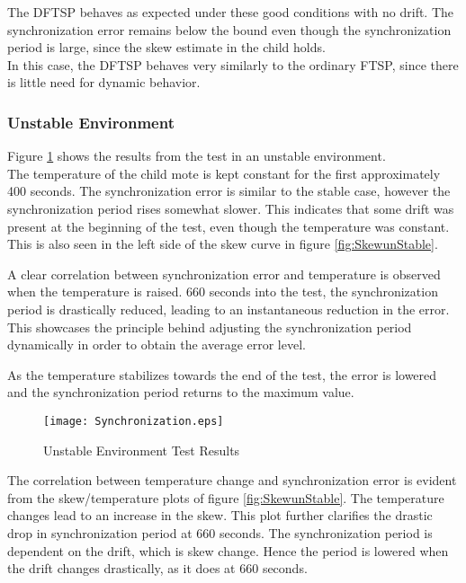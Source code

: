 \documentclass[Main]{subfiles}
\begin{document}
			The DFTSP behaves as expected under these good conditions with no drift. 
			The synchronization error remains below the bound even though the synchronization period is large, since the skew estimate in the child holds.
			\\ In this case, the DFTSP behaves very similarly to the ordinary FTSP, since there is little need for dynamic behavior. 



		\subsubsection{Unstable Environment} %
		\label{sub:unstable_environment}
			
			 Figure \ref{fig:unstableSynchronization} shows the results from the test in an unstable environment.
			 \\The temperature of the child mote is kept constant for the first approximately 400 seconds.
			 The synchronization error is similar to the stable case, however the synchronization period rises somewhat slower.
			 This indicates that some drift was present at the beginning of the test, even though the temperature was constant.
			 This is also seen in the left side of the skew curve in figure \ref{fig:SkewunStable}. 

			 A clear correlation between synchronization error and temperature is observed when the temperature is raised.
			 660 seconds into the test, the synchronization period is drastically reduced, leading to an instantaneous reduction in the error.
			 This showcases the principle behind adjusting the synchronization period dynamically in order to obtain the average error level.

			 As the temperature stabilizes towards the end of the test, the error is lowered and the synchronization period returns to the maximum value.  

			\begin{figure}[H]
				\centering
				\texttt{[image: Synchronization.eps]}
				\caption{Unstable Environment Test Results}
				\label{fig:unstableSynchronization}
			\end{figure}

			The correlation between temperature change and synchronization error is evident from the skew/temperature plots of figure \ref{fig:SkewunStable}.
			The temperature changes lead to an increase in the skew.
			This plot further clarifies the drastic drop in synchronization period at 660 seconds.
			The synchronization period is dependent on the drift, which is skew change. 
			Hence the period is lowered when the drift changes drastically, as it does at 660 seconds.
\end{document}

